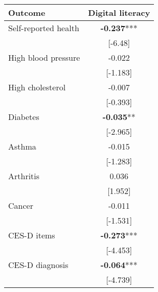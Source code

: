 \documentclass[11pt]{article}
\begin{document}
    \begin{tabular}{lc}
        \toprule
        Outcome & Digital literacy \\
        \midrule
        Self-reported health & \textbf{-0.237}*** \\
        & [-6.48] \\
        High blood pressure & -0.022 \\
        & [-1.183] \\
        High cholesterol & -0.007 \\
        & [-0.393] \\
        Diabetes & \textbf{-0.035}** \\
        & [-2.965] \\
        Asthma & -0.015 \\
        & [-1.283] \\
        Arthritis & 0.036 \\
        & [1.952] \\
        Cancer & -0.011 \\
        & [-1.531] \\
        CES-D items & \textbf{-0.273}*** \\
        & [-4.453] \\
        CES-D diagnosis & \textbf{-0.064}*** \\
        & [-4.739] \\
        \bottomrule
    \end{tabular}
\end{document}
